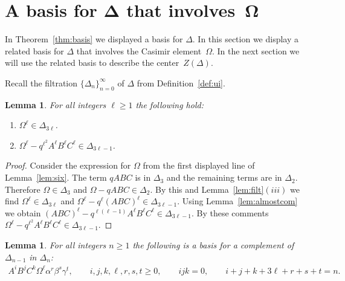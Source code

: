 \documentclass[11pt]{article}
\numberwithin{equation}{section}
\newtheorem{Lemma}[Theorem]{Lemma}
\begin{document}
\section[A basis for~$\Delta $ that involves~$\Omega$]{A basis for $\boldsymbol{\Delta}$ that involves~$\boldsymbol{\Omega}$}

 In Theorem~\ref{thm:basis} we displayed a basis for
$\Delta $. In this section we display a related
basis for $\Delta $ that involves the Casimir element~$\Omega$.
In the next section we will use the related basis
to describe  the center~$Z(\Delta )$.

 Recall the f\/iltration $\lbrace \Delta_n \rbrace_{n=0}^\infty$
of $\Delta $ from Def\/inition~\ref{def:ui}.


\begin{Lemma}
\label{lem:omegapower}
For all integers $\ell \geq 1$
the following hold:
\begin{enumerate}\itemsep=0pt
\item[$(i)$] $\Omega^\ell \in \Delta_{3 \ell}$.
\item[$(ii)$] $\Omega^\ell -q^{\ell^2}A^\ell B^\ell C^\ell  \in
\Delta_{3\ell-1}$.
\end{enumerate}
\end{Lemma}

\begin{proof}
Consider the expression for $\Omega$ from the
f\/irst displayed line of
Lemma~\ref{lem:six}.
The term $qABC$ is in $\Delta_3$
and the remaining terms are in $\Delta_2$. Therefore
$\Omega \in \Delta_3$ and $\Omega-qABC \in \Delta_2$. By this and
Lemma~\ref{lem:filt}$(iii)$ we f\/ind
$\Omega^\ell \in \Delta_{3\ell}$ and
$\Omega^\ell - q^\ell (ABC)^\ell
\in \Delta_{3\ell-1}$.
Using Lemma~\ref{lem:almostcom}  we obtain
$(ABC)^\ell -q^{\ell (\ell-1)}A^\ell B^\ell C^\ell \in \Delta_{3\ell -1}$.
By these comments
$\Omega^\ell -q^{\ell^2}A^\ell B^\ell C^\ell  \in \Delta_{3\ell-1}$.
\end{proof}

\begin{Lemma}
\label{lem:basis2c}
For all integers $n\geq 1$
the following is a basis
for a complement of
$\Delta_{n-1}$ in $\Delta_n$:
\begin{gather*}
 A^iB^jC^k\Omega^\ell \alpha^r \beta^s \gamma^t, \qquad
i,j,k,\ell, r,s,t\geq 0,
\qquad ijk=0,
 \qquad
i+j+k+3\ell+r+s+t = n.
\end{gather*}
\end{Lemma}
\end{document}
